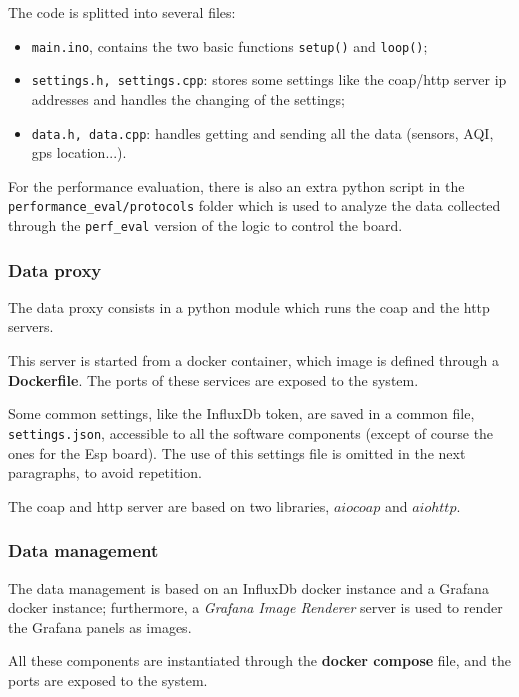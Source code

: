 \documentclass[]{article}
\begin{document}

The code is splitted into several files:
\begin{itemize}
	\item \texttt{main.ino}, contains the two basic functions \texttt{setup()} and \texttt{loop()};
	\item \texttt{settings.h, settings.cpp}: stores some settings like the coap/http server ip addresses and handles the changing of the settings;
	\item \texttt{data.h, data.cpp}: handles getting and sending all the data (sensors, AQI, gps location...).
\end{itemize}

For the performance evaluation, there is also an extra python script in the \texttt{performance\_eval/protocols} folder which is used to analyze the data collected through the \texttt{perf\_eval} version of the logic to control the board. 

\subsubsection{Data proxy}
The data proxy consists in a python module which runs the coap and the http servers.

This server is started from a docker container, which image is defined through a \textbf{Dockerfile}. The ports of these services are exposed to the system. 

Some common settings, like the InfluxDb token, are saved in a common file, \texttt{settings.json}, accessible to all the software components (except of course the ones for the Esp board). The use of this settings file is omitted in the next paragraphs, to avoid repetition.

The coap and http server are based on two libraries, $ aiocoap $  and $ aiohttp $.  

\subsubsection{Data management}
The data management is based on an InfluxDb docker instance and a Grafana docker instance; furthermore, a \textit{Grafana Image Renderer} server is used to render the Grafana panels as images. 

All these components are instantiated through the \textbf{docker compose} file, and the ports are exposed to the system. 
\end{document}
